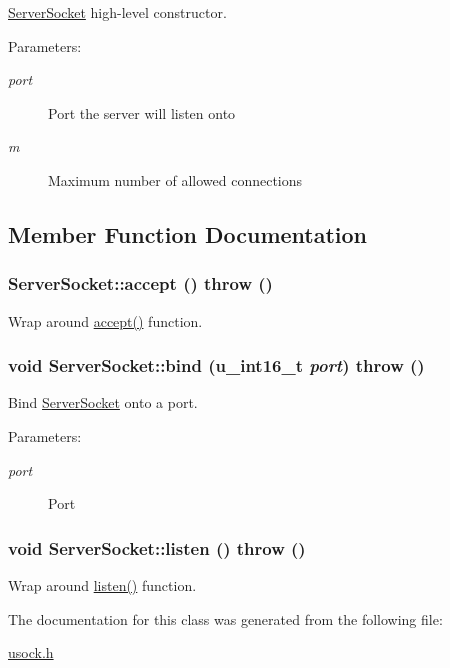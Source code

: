 \hyperlink{classServerSocket}{ServerSocket} high-level constructor. 

\begin{Desc}
\item[Parameters:]
\begin{description}
\item[{\em port}]Port the server will listen onto \item[{\em m}]Maximum number of allowed connections \end{description}
\end{Desc}


\subsection{Member Function Documentation}
\hypertarget{classServerSocket_19d273ccd11c4358b3079e3d39de23ac}{
\subsubsection[{accept}]{ ServerSocket::accept ()  throw ()}}
\label{classServerSocket_19d273ccd11c4358b3079e3d39de23ac}


Wrap around \hyperlink{classServerSocket_19d273ccd11c4358b3079e3d39de23ac}{accept()} function. 

\hypertarget{classServerSocket_5f06d9894c131e56ca57d4f8eb0743e7}{
\subsubsection[{bind}]{\setlength{\rightskip}{0pt plus 5cm}void ServerSocket::bind (u\_\-int16\_\-t {\em port})  throw ()}}
\label{classServerSocket_5f06d9894c131e56ca57d4f8eb0743e7}


Bind \hyperlink{classServerSocket}{ServerSocket} onto a port. 

\begin{Desc}
\item[Parameters:]
\begin{description}
\item[{\em port}]Port \end{description}
\end{Desc}
\hypertarget{classServerSocket_de19b5aa12a8bccfa1d020f12de1c857}{
\subsubsection[{listen}]{\setlength{\rightskip}{0pt plus 5cm}void ServerSocket::listen ()  throw ()}}
\label{classServerSocket_de19b5aa12a8bccfa1d020f12de1c857}


Wrap around \hyperlink{classServerSocket_de19b5aa12a8bccfa1d020f12de1c857}{listen()} function. 



The documentation for this class was generated from the following file:\begin{CompactItemize}
\item 
\hyperlink{usock_8h}{usock.h}\end{CompactItemize}
